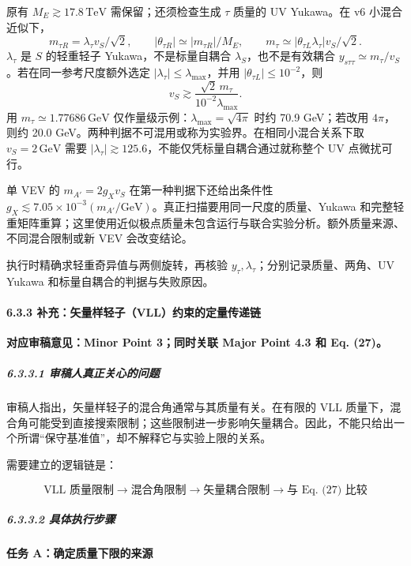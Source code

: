 \documentclass[
  chinese,
  UTF8]{ctexart}
\begin{document}
原有 \(M_E\gtrsim17.8\,\mathrm{TeV}\) 需保留；还须检查生成 \(\tau\)
质量的 UV Yukawa。在 v6 小混合近似下， \[
m_{\tau R}=\lambda_\tau v_S/\sqrt2,\qquad
|\theta_{\tau R}|\simeq|m_{\tau R}|/M_E,\qquad
m_\tau\simeq|\theta_{\tau L}\lambda_\tau|v_S/\sqrt2.
\] \(\lambda_\tau\) 是 \(S\) 的轻重轻子 Yukawa，不是标量自耦合
\(\lambda_S\)，也不是有效耦合
\(y_{s\tau\tau}\simeq m_\tau/v_S\)。若在同一参考尺度额外选定
\(|\lambda_\tau|\le\lambda_{\max}\)，并用
\(|\theta_{\tau L}|\le10^{-2}\)，则 \[
v_S\gtrsim\frac{\sqrt2\,m_\tau}{10^{-2}\lambda_{\max}}.
\] 用 \(m_\tau\simeq1.77686\,\mathrm{GeV}\)
仅作量级示例：\(\lambda_{\max}=\sqrt{4\pi}\) 时约 70.9 GeV；若改用
\(4\pi\)，则约 20.0
GeV。两种判据不可混用或称为实验界。在相同小混合关系下取
\(v_S=2\,\mathrm{GeV}\) 需要
\(|\lambda_\tau|\gtrsim125.6\)，不能仅凭标量自耦合通过就称整个 UV
点微扰可行。

单 VEV 的 \(m_{A'}=2g_Xv_S\) 在第一种判据下还给出条件性
\(g_X\lesssim7.05\times10^{-3}(m_{A'}/\mathrm{GeV})\)。真正扫描要用同一尺度的质量、Yukawa
和完整轻重矩阵重算；这里使用近似极点质量未包含运行与联合实验分析。额外质量来源、不同混合限制或新
VEV 会改变结论。

执行时精确求轻重奇异值与两侧旋转，再核验
\(y_\tau,\lambda_\tau\)；分别记录质量、两角、UV Yukawa
和标量自耦合的判据与失败原因。

\paragraph{6.3.3
补充：矢量样轻子（VLL）约束的定量传递链}\label{ux8865ux5145ux77e2ux91cfux6837ux8f7bux5b50vllux7ea6ux675fux7684ux5b9aux91cfux4f20ux9012ux94fe}

\textbf{对应审稿意见：Minor Point 3；同时关联 Major Point 4.3 和 Eq.
(27)。}

\subparagraph{6.3.3.1
审稿人真正关心的问题}\label{ux5ba1ux7a3fux4ebaux771fux6b63ux5173ux5fc3ux7684ux95eeux9898-2}

审稿人指出，矢量样轻子的混合角通常与其质量有关。在有限的 VLL
质量下，混合角可能受到直接搜索限制；这些限制进一步影响矢量耦合。因此，不能只给出一个所谓``保守基准值''，却不解释它与实验上限的关系。

需要建立的逻辑链是：

\[
\boxed{
\text{VLL 质量限制}
\longrightarrow
\text{混合角限制}
\longrightarrow
\text{矢量耦合限制}
\longrightarrow
\text{与 Eq. (27) 比较}
}
\]

\subparagraph{6.3.3.2
具体执行步骤}\label{ux5177ux4f53ux6267ux884cux6b65ux9aa4-2}

\textbf{任务 A：确定质量下限的来源}
\end{document}
